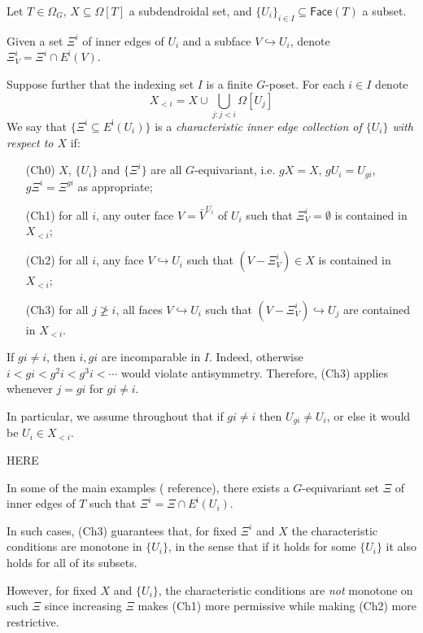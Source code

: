 \documentclass[a4paper,10pt,draft]{article}%
\begin{document}
\begin{definition}\label{CHAREDGE DEF}
Let $T \in \Omega_G$, $X \subseteq \Omega[T]$ a subdendroidal set, and $\{U_i\}_{i \in I} \subseteq \mathsf{Face}(T)$ a subset.

Given a set $\Xi^i$ of inner edges of $U_i$ and a subface $V \hookrightarrow U_i$, denote $\Xi_V^i = \Xi^i \cap E^{\mathsf{i}}(V)$.

Suppose further that the indexing set $I$ is a 
finite $G$-poset. For each $i \in I$ denote
\[
X_{<i} = X \cup \bigcup_{j \colon j<i} \Omega[U_j]
\]
We say that $\{\Xi^i \subseteq E^{\mathsf{i}}(U_i)\}$ 
is a \textit{characteristic inner edge collection of $\{U_i\}$ with respect to $X$} if:
\begin{itemize}
	\item[(Ch0)] $X$, $\{U_i\}$ and $\{\Xi^i\}$ are all $G$-equivariant, i.e. $g X = X$, $g U_i = U_{gi}$, $g \Xi^i = \Xi^{gi}$ as appropriate; 
	\item[(Ch1)] for all $i$, any outer face $V = \bar{V}^{U_i}$
		of $U_i$ such that $\Xi_{V}^i = \emptyset$
		is contained in $X_{<i}$;
	\item[(Ch2)] for all $i$, any face
		$V \hookrightarrow U_i$ such that $(V-\Xi_V^i) \in X$
		is contained in $X_{<i}$;
	\item[(Ch3)] for all $j \not \geq i$, 
		all faces $V \hookrightarrow U_i$ such that 
		$(V-\Xi^i_V) \hookrightarrow U_j$
		are contained in $X_{<i}$.
\end{itemize}
\end{definition}


\begin{remark}\label{XIIII REM}
If $g i \neq i$, then $i,g i$ are incomparable in $I$. Indeed, otherwise $i<gi<g^2i<g^3i<\cdots$ would violate antisymmetry.
Therefore, (Ch3) applies whenever $j=gi$ for $gi\neq i$.

In particular, we assume throughout that if
$gi \neq i$ then $U_{gi} \neq U_i$,
or else it would be $U_i \in X_{<i}$.
\end{remark}


{\color{red} HERE}


\begin{remark}
In some of the main examples ({\color{red} reference}), there exists a $G$-equivariant set 
$\Xi$ of inner edges of $T$ such that $\Xi^i = \Xi \cap E^{\mathsf{i}}(U_i)$.

In such cases, (Ch3) guarantees that, for fixed $\Xi^i$ and $X$ the characteristic conditions are monotone in $\{U_i\}$, in the sense that if it holds for some $\{U_i\}$ it also holds for all of its subsets.
	
	However, for fixed $X$ and $\{U_i\}$, the characteristic conditions are \textit{not} monotone on such $\Xi$ since increasing $\Xi$ makes (Ch1) more permissive while making (Ch2) more restrictive.
\end{remark}
\end{document}
